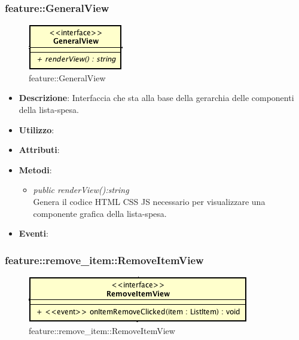 \subsubsection{feature::GeneralView}

\label{feature::GeneralView}
\begin{figure}[H]
	\centering
	\includegraphics[scale=0.5]{Sezioni/SottosezioniST/img/app/GeneralView.png}
	\caption{feature::GeneralView}
\end{figure}

\begin{itemize}
\item \textbf{Descrizione}: Interfaccia che sta alla base della gerarchia delle componenti della lista-spesa.
\item \textbf{Utilizzo}:
\item \textbf{Attributi}: 
\item \textbf{Metodi}:
	\begin{itemize}
	\item \textit{public renderView():string}\\
	Genera il codice HTML CSS JS necessario per visualizzare una componente grafica della lista-spesa.
	\end{itemize}
\item \textbf{Eventi}:
\end{itemize}

\subsubsection{feature::remove\_item::RemoveItemView}

\label{feature::remove_item::RemoveItemView}
\begin{figure}[H]
	\centering
	\includegraphics[scale=0.5]{Sezioni/SottosezioniST/img/app/RemoveItemView.png}
	\caption{feature::remove\_item::RemoveItemView}
\end{figure}

